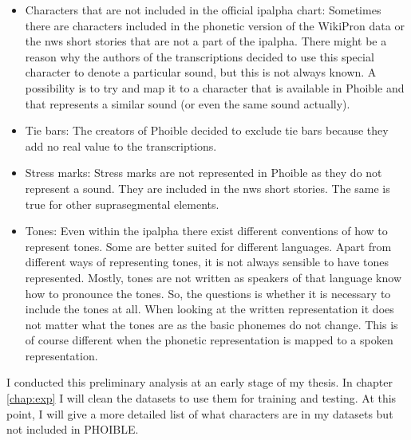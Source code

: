 \begin{itemize}
\item Characters that are not included in the official \ac{ipalpha} chart: Sometimes there are characters included in the phonetic version of the WikiPron data or the \ac{nws} short stories that are not a part of the \ac{ipalpha}. There might be a reason why the authors of the transcriptions decided to use this special character to denote a particular sound, but this is not always known. A possibility is to try and map it to a character that is available in Phoible and that represents a similar sound (or even the same sound actually). 
\item Tie bars: The creators of Phoible decided to exclude tie bars because they add no real value to the transcriptions.
\item Stress marks: Stress marks are not represented in Phoible as they do not represent a sound. They are included in the \ac{nws} short stories. The same is true for other suprasegmental elements.
\item Tones: Even within the \ac{ipalpha} there exist different conventions of how to represent tones. Some are better suited for different languages. Apart from different ways of representing tones, it is not always sensible to have tones represented. Mostly, tones are not written as speakers of that language know how to pronounce the tones. So, the questions is whether it is necessary to include the tones at all. When looking at the written representation it does not matter what the tones are as the basic phonemes do not change. This is of course different when the phonetic representation is mapped to a spoken representation.
\end{itemize}

I conducted this preliminary analysis at an early stage of my thesis. In chapter \ref{chap:exp} I will clean the datasets to use them for training and testing. At this point, I will give a more detailed list of what characters are in my datasets but not included in PHOIBLE.







